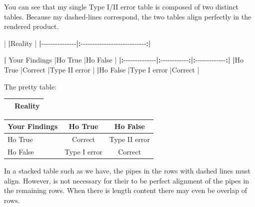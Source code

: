 \documentclass[
]{book}
\newenvironment{Shaded}{\begin{snugshade}}{\end{snugshade}}
\newcommand{\ErrorTok}[1]{\textcolor[rgb]{0.64,0.00,0.00}{\textbf{#1}}}
\newcommand{\NormalTok}[1]{#1}
\newcommand{\SpecialCharTok}[1]{\textcolor[rgb]{0.00,0.00,0.00}{#1}}
\begin{document}
You can see that my single Type I/II error table is composed of two distinct tables. Because my dashed-lines correspond, the two tables align perfectly in the rendered product.

\begin{Shaded}
\begin{Highlighting}[]
\SpecialCharTok{|}               \ErrorTok{|}\NormalTok{Reality                       }\SpecialCharTok{|}
\ErrorTok{|}\SpecialCharTok{{-}{-}{-}{-}{-}{-}{-}{-}{-}{-}{-}{-}{-}{-}{-}}\ErrorTok{|:}\SpecialCharTok{{-}{-}{-}{-}{-}{-}{-}{-}{-}{-}{-}{-}{-}{-}{-}{-}{-}{-}{-}{-}{-}{-}{-}{-}{-}{-}{-}{-}}\ErrorTok{:|}

\ErrorTok{|}\NormalTok{ Your Findings }\SpecialCharTok{|}\NormalTok{Ho True       }\SpecialCharTok{|}\NormalTok{Ho False       }\SpecialCharTok{|}
\ErrorTok{|:}\SpecialCharTok{{-}{-}{-}{-}{-}{-}{-}{-}{-}{-}{-}{-}{-}{-}}\ErrorTok{|:}\SpecialCharTok{{-}{-}{-}{-}{-}{-}{-}{-}{-}{-}{-}{-}}\ErrorTok{:|:}\SpecialCharTok{{-}{-}{-}{-}{-}{-}{-}{-}{-}{-}{-}{-}{-}}\ErrorTok{:|}
\ErrorTok{|}\NormalTok{Ho True        }\SpecialCharTok{|}\NormalTok{Correct       }\SpecialCharTok{|}\NormalTok{Type II error  }\SpecialCharTok{|}
\ErrorTok{|}\NormalTok{Ho False       }\SpecialCharTok{|}\NormalTok{Type I error  }\SpecialCharTok{|}\NormalTok{Correct        }\SpecialCharTok{|}
\end{Highlighting}
\end{Shaded}

The pretty table:

\begin{longtable}[]{@{}lc@{}}
\toprule
& Reality \\
\midrule
\endhead
\bottomrule
\end{longtable}

\begin{longtable}[]{@{}lcc@{}}
\toprule
Your Findings & Ho True & Ho False \\
\midrule
\endhead
Ho True & Correct & Type II error \\
Ho False & Type I error & Correct \\
\bottomrule
\end{longtable}

In a stacked table such as we have, the pipes in the rows with dashed lines must align. However, is not necessary for their to be perfect alignment of the pipes in the remaining rows. When there is length content there may even be overlap of rows.
\end{document}
